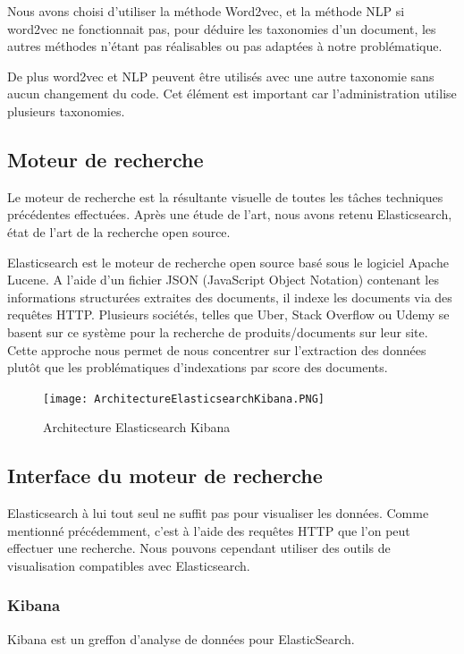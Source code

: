 Nous avons choisi d'utiliser la méthode Word2vec, et la méthode NLP si word2vec ne fonctionnait pas, pour déduire les taxonomies d'un document, les autres méthodes n'étant pas réalisables ou pas adaptées à notre problématique.

De plus word2vec et NLP peuvent être utilisés avec une autre taxonomie sans aucun changement du code.
Cet élément est important car l'administration utilise plusieurs taxonomies. 


\subsection{Moteur de recherche}
Le moteur de recherche est la résultante visuelle de toutes les tâches techniques précédentes effectuées.
Après une étude de l'art, nous avons retenu Elasticsearch, état de l'art de la recherche open source.

Elasticsearch est le moteur de recherche open source basé sous le logiciel Apache Lucene.
A l'aide d'un fichier JSON (JavaScript Object Notation) contenant les informations structurées extraites des documents, il indexe les documents via des requêtes HTTP\@.
Plusieurs sociétés, telles que Uber, Stack Overflow ou Udemy se basent sur ce système pour la recherche de produits/documents sur leur site. 
Cette approche nous permet de nous concentrer sur l'extraction des données plutôt que les problématiques d'indexations par score des documents.

\begin{figure}[h!]
  \centering
  \texttt{[image: ArchitectureElasticsearchKibana.PNG]}
	\caption[]{Architecture Elasticsearch Kibana}
	\label{}
\end{figure}



\subsection{Interface du moteur de recherche}
Elasticsearch à lui tout seul ne suffit pas pour visualiser les données.
Comme mentionné précédemment, c'est à l’aide des requêtes HTTP que l’on peut effectuer une recherche.
Nous pouvons cependant utiliser des outils de visualisation compatibles avec Elasticsearch.

\subsubsection{Kibana}
Kibana est un greffon d'analyse de données pour ElasticSearch.

